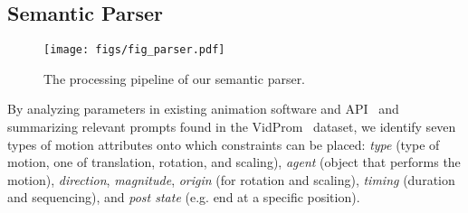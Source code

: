 \subsection{Semantic Parser}
\begin{figure*}[t]
    \centering
    \texttt{[image: figs/fig\_parser.pdf]}
    \caption{
        The processing pipeline of our semantic parser. 
    }
    \label{fig:parser}
\end{figure*}
    


By analyzing parameters in existing animation software and
API~\cite{TODO} and summarizing relevant prompts found in the
VidProm~\cite{wang2024vidprom} dataset, we identify seven types of
motion attributes onto which constraints can be placed: \textit{type}
(type of motion, one of translation, rotation, and scaling),
\textit{agent} (object that performs the motion), \textit{direction},
\textit{magnitude}, \textit{origin} (for rotation and scaling),
\textit{timing} (duration and sequencing), and \textit{post state}
(e.g. end at a specific position).

